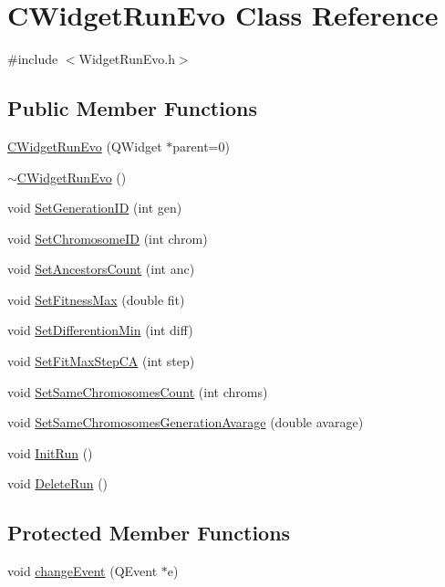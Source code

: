 \hypertarget{classCWidgetRunEvo}{
\section{CWidgetRunEvo Class Reference}
\label{classCWidgetRunEvo}
}


{\ttfamily \#include $<$WidgetRunEvo.h$>$}\subsection*{Public Member Functions}
\begin{DoxyCompactItemize}
\item 
\hyperlink{classCWidgetRunEvo_aae34e6942f7140d3f2d09da22c676cfa}{CWidgetRunEvo} (QWidget $\ast$parent=0)
\item 
\hyperlink{classCWidgetRunEvo_a4ffbe6072c867efccd2f86b56025ff81}{$\sim$CWidgetRunEvo} ()
\item 
void \hyperlink{classCWidgetRunEvo_abdd9364c205077d89a8b035bde281333}{SetGenerationID} (int gen)
\item 
void \hyperlink{classCWidgetRunEvo_a211feb5cbc0aa56bf7f1fec311147e25}{SetChromosomeID} (int chrom)
\item 
void \hyperlink{classCWidgetRunEvo_adcde320a6ac35f038635b9b939e1a55a}{SetAncestorsCount} (int anc)
\item 
void \hyperlink{classCWidgetRunEvo_a7630b9619d91cc4646c271bb84381ef0}{SetFitnessMax} (double fit)
\item 
void \hyperlink{classCWidgetRunEvo_ae7ba5d50aef88fecebb71eee3b4ec219}{SetDifferentionMin} (int diff)
\item 
void \hyperlink{classCWidgetRunEvo_afb5f777390303f31e53c73ee79835438}{SetFitMaxStepCA} (int step)
\item 
void \hyperlink{classCWidgetRunEvo_a672696ba23b4a364537f778e6d76bb43}{SetSameChromosomesCount} (int chroms)
\item 
void \hyperlink{classCWidgetRunEvo_af2907467c76427f63289bce49cee1d5a}{SetSameChromosomesGenerationAvarage} (double avarage)
\item 
void \hyperlink{classCWidgetRunEvo_a2935d7e3239714ed5ee41cdd37159381}{InitRun} ()
\item 
void \hyperlink{classCWidgetRunEvo_a85c3bfa5797da385ddacdab56a529404}{DeleteRun} ()
\end{DoxyCompactItemize}
\subsection*{Protected Member Functions}
\begin{DoxyCompactItemize}
\item 
void \hyperlink{classCWidgetRunEvo_a4e9e503239d0f1d2c06369fb39481762}{changeEvent} (QEvent $\ast$e)
\end{DoxyCompactItemize}

